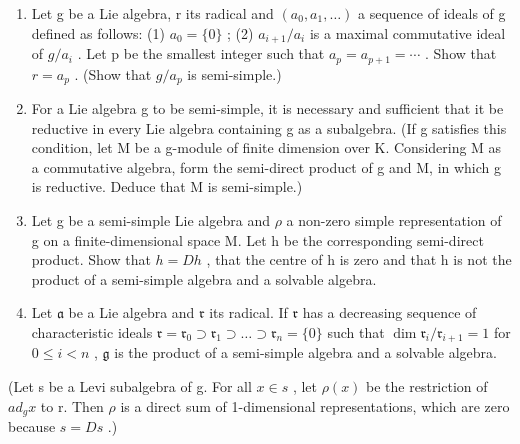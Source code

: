 \begin{enumerate}
\def\labelenumi{\arabic{enumi}.}
\setcounter{enumi}{1}
\item
  Let g be a Lie algebra, r its radical and \((a_{0}, a_{1}, \ldots)\) a sequence of ideals of g defined as follows: (1) \(a_{0} = \{0\}\) ; (2) \(a_{i+1}/a_{i}\) is a maximal commutative ideal of \(g/a_{i}\) . Let p be the smallest integer such that \(a_{p} = a_{p+1} = \cdots\) . Show that \(r = a_{p}\) . (Show that \(g/a_{p}\) is semi-simple.)
\item
  For a Lie algebra g to be semi-simple, it is necessary and sufficient that it be reductive in every Lie algebra containing g as a subalgebra. (If g satisfies this condition, let M be a g-module of finite dimension over K. Considering M as a commutative algebra, form the semi-direct product of g and M, in which g is reductive. Deduce that M is semi-simple.)
\item
  Let g be a semi-simple Lie algebra and \(\rho\) a non-zero simple representation of g on a finite-dimensional space M. Let h be the corresponding semi-direct product. Show that \(h = Dh\) , that the centre of h is zero and that h is not the product of a semi-simple algebra and a solvable algebra.
\item
  Let \(\mathfrak{a}\) be a Lie algebra and \(\mathfrak{r}\) its radical. If \(\mathfrak{r}\) has a decreasing sequence of characteristic ideals \(\mathfrak{r} = \mathfrak{r}_0 \supset \mathfrak{r}_1 \supset \dots \supset \mathfrak{r}_n = \{0\}\) such that \(\dim \mathfrak{r}_i / \mathfrak{r}_{i+1} = 1\) for \(0 \leqslant i < n\) , \(\mathfrak{g}\) is the product of a semi-simple algebra and a solvable algebra.
\end{enumerate}

(Let s be a Levi subalgebra of g. For all \(x \in s\) , let \(\rho(x)\) be the restriction of \(ad_{g}x\) to r. Then \(\rho\) is a direct sum of 1-dimensional representations, which are zero because \(s = Ds\) .)

